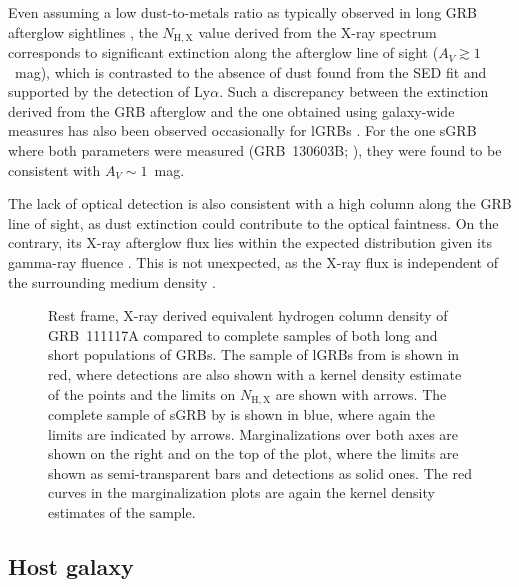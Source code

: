 \documentclass[referee]{aa}
\newcommand{\lya}{Ly$\alpha$}
\begin{document}
Even assuming a low dust-to-metals ratio as typically observed in long GRB
afterglow sightlines \citep{Galama2001, Schady2010, Covino2013}, the
$N_\mathrm{H,X}$ value derived from the X-ray spectrum corresponds to
significant extinction along the afterglow line of sight ($A_V \gtrsim 1$~mag),
which is contrasted to the absence of dust found from the SED fit and supported
by the detection of \lya{}. Such a discrepancy between the extinction derived
from the GRB afterglow and the one obtained using galaxy-wide measures has also
been observed occasionally for lGRBs \citep{Perley2013a}. For the one sGRB where
both parameters were measured (GRB~130603B; \citealt{DeUgartePostigo2014b}),
they were found to be consistent with $A_V \sim 1$~mag.

The lack of optical detection is also consistent with a high column along the
GRB line of sight, as dust extinction could contribute to the optical faintness.
On the contrary, its X-ray afterglow flux lies within the expected distribution
given its gamma-ray fluence \citep{DAvanzo2014a}. This is not unexpected, as the
X-ray flux is independent of the surrounding medium density \citep{Freedman2001,
	Berger2003, Nysewander2009}.

\begin{figure}
\caption{Rest frame, X-ray derived equivalent hydrogen column density of
	GRB~111117A compared to complete samples of both long and short populations of
	GRBs. The sample of lGRBs from \citet{Arcodia2016} is shown in red, where
	detections are also shown with a kernel density estimate of the points and the
	limits on $N_\mathrm{H,X}$ are shown with arrows. The complete sample of sGRB by
	\citet{DAvanzo2014a} is shown in blue, where again the limits are indicated by
	arrows. Marginalizations over both axes are shown on the right and on the top of
	the plot, where the limits are shown as semi-transparent bars and detections as
	solid ones. The red curves in the marginalization plots are again the kernel
	density estimates of the \citet{Arcodia2016} sample.} \label{fig:NH_z}
\end{figure}


\subsection{Host galaxy}
\end{document}
